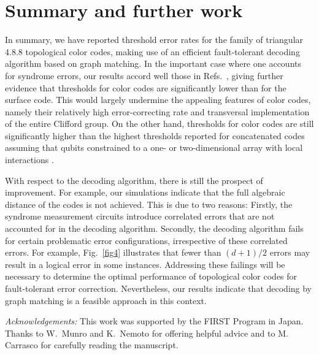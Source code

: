 \documentclass[letterpaper,showpacs,superscriptaddress,twocolumn,aps,prl]{revtex4-1}
\begin{document}
\section{Summary and further work}
In summary, we have reported threshold error rates for the family of triangular 4.8.8 topological color codes, making use of an efficient fault-tolerant decoding algorithm based on graph matching. In the important case where one accounts for syndrome errors, our results accord well those in Refs.~\cite{Landahl1,Wang10b}, giving further evidence that thresholds for color codes are significantly lower than for the surface code. This would largely undermine the appealing features of color codes, namely their relatively high error-correcting rate and transversal implementation of the entire Clifford group. On the other hand, thresholds for color codes are still significantly higher than the highest thresholds reported for concatenated codes assuming that qubits constrained to a one- or two-dimensional array with local interactions \cite{Stephens09,Spedalieri09}. 

With respect to the decoding algorithm, there is still the prospect of improvement. For example, our simulations indicate that the full algebraic distance of the codes is not achieved. This is due to two reasons: Firstly, the syndrome measurement circuits introduce correlated errors that are not accounted for in the decoding algorithm. Secondly, the decoding algorithm fails for certain problematic error configurations, irrespective of these correlated errors. For example, Fig.~\ref{fig4} illustrates that fewer than $(d+1)/2$ errors may result in a logical error in some instances. Addressing these failings will be necessary to determine the optimal performance of topological color codes for fault-tolerant error correction. Nevertheless, our results indicate that decoding by graph matching is a feasible approach in this context. 

{\it Acknowledgements:} This work was supported by the FIRST Program in Japan. Thanks to W.~Munro and K.~Nemoto for offering helpful advice and to M. Carrasco for carefully reading the manuscript.
\end{document}
